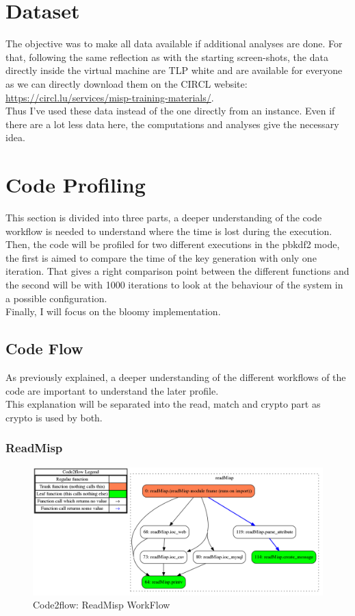 \documentclass{eplmastersthesis}
\begin{document}
\section{Dataset}
The objective was to make all data available if additional analyses are done. For that, following the same reflection as with the starting screen-shots, the data directly inside the virtual machine are TLP white and are available for everyone as we can directly download them on the CIRCL website: \url{https://circl.lu/services/misp-training-materials/}.\\
Thus I've used these data instead of the one directly from an instance. Even if there are a lot less data here, the computations and analyses give the necessary idea.

\section{Code Profiling}
This section is divided into three parts, a deeper understanding of the code workflow is needed to understand where the time is lost during the execution. Then, the code will be profiled for two different executions in the \gls{pbkdf2} mode, the first is aimed to compare the time of the key generation with only one iteration. That gives a right comparison point between the different functions and the second will be with 1000 iterations to look at the behaviour of the system in a possible configuration. \\
Finally, I will focus on the bloomy implementation.

\subsection{Code Flow}
As previously explained, a deeper understanding of the different workflows of the code are important to understand the later profile.\\
This explanation will be separated into the read, match and crypto part as crypto is used by both.

\subsubsection{ReadMisp}
\begin{figure}[h!]
\begin{center}
	\includegraphics[scale=0.3]{res/flowReadMisp}
	\caption{Code2flow: ReadMisp WorkFlow}
	\label{code2flow-readMisp}
\end{center}
\end{figure}
\end{document}
